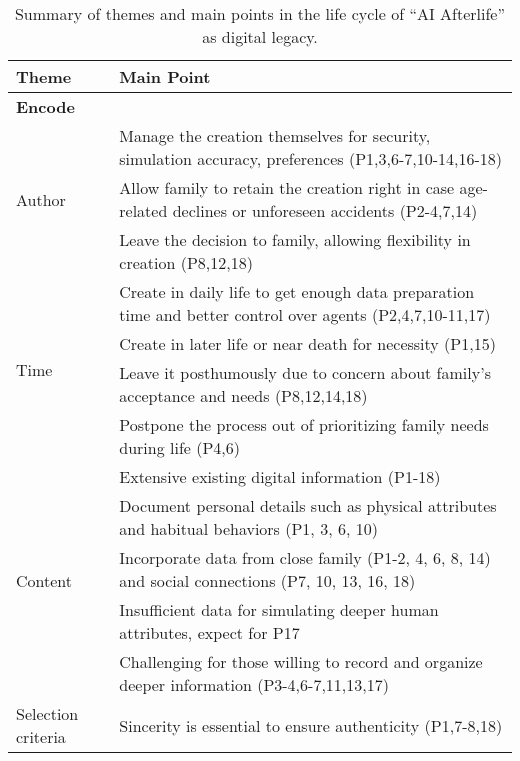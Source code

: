 \begin{table*}[htbp]
  \caption{Summary of themes and main points in the life cycle of ``AI Afterlife'' as digital legacy.}
  \label{tab:summary of themes and main points in life cycle}
  \begin{tabular}{p{}p{}}
    \toprule
    \textbf{Theme} & \textbf{Main Point} \\
    \midrule
    \textbf{Encode}&\\
    \hline
    \multirow{3}{=}{Author} 
            & Manage the creation themselves for security, simulation accuracy, preferences (P1,3,6-7,10-14,16-18) \\ %
             &\cellcolor{gray!15}Allow family to retain the creation right in case age-related declines or unforeseen accidents (P2-4,7,14)  \\ %
             & Leave the decision to family, allowing flexibility in creation (P8,12,18) \\
    \hline
    \multirow{4}{=}{Time} 
            & \cellcolor{gray!15}Create in daily life to get enough data preparation time and better control over agents (P2,4,7,10-11,17) \\
            & Create in later life or near death for necessity (P1,15) \\ %
             & \cellcolor{gray!15}Leave it posthumously due to concern about family's acceptance and needs (P8,12,14,18) \\ %
             & Postpone the process out of prioritizing family needs during life (P4,6) \\
    \hline
    \multirow{5}{=}{Content}
            & \cellcolor{gray!15}Extensive existing digital information (P1-18) \\ %
            & Document personal details such as physical attributes and habitual behaviors (P1, 3, 6, 10) \\ %
            & \cellcolor{gray!15}Incorporate data from close family (P1-2, 4, 6, 8, 14) and social connections (P7, 10, 13, 16, 18)  \\ %
            & Insufficient data for simulating deeper human attributes, expect for P17 \\ %
            & \cellcolor{gray!15}Challenging for those willing to record and organize deeper information (P3-4,6-7,11,13,17) \\
    \hline
    \multirow{5}{=}{Selection criteria}
            & Sincerity is essential to ensure authenticity (P1,7-8,18) \\

\end{tabular}
\end{table*}
